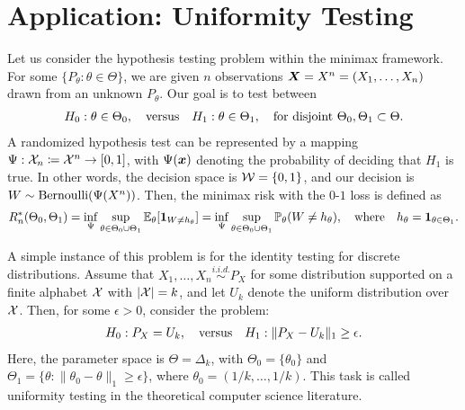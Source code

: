 \documentclass[12pt]{article}
\begin{document}
\section{Application: Uniformity Testing} 
\label{sec:application-1-uniformity-testing}

Let us consider the hypothesis testing problem within the minimax framework. For some $\{P_\theta: \theta \in \Theta\}$, we are given $n$ \iid observations ${\boldsymbol X} = X^n = (X_1, \ldots, X_n)$ drawn from an unknown $P_\theta$. Our goal is to test between 
\begin{align}
	H_0: \theta \in \Theta_0, \quad \text{versus} \quad H_1: \theta \in \Theta_1, \quad \text{for disjoint } \Theta_0, \Theta_1 \subset \Theta. 
\end{align}
A randomized hypothesis test can be represented by a mapping $\Psi:{\cal X}_n \coloneqq {\cal X}^n \to [0,1]$, with $\Psi({\boldsymbol x})$ denoting the probability of deciding that $H_1$ is true. In other words, the decision space is ${\cal W} = \{0,1\}$, and our decision is $W \sim \mathrm{Bernoulli}(\Psi(X^n))$. Then, the minimax risk with the $0$-$1$ loss is defined as 
\begin{align}
R_n^*(\Theta_0, \Theta_1) = \inf_{\Psi} \sup_{\theta \in \Theta_0 \cup \Theta_1} \mathbb{E}_{\theta}[\boldsymbol{1}_{W \neq h_\theta}] = \inf_{\Psi} \sup_{\theta \in \Theta_0 \cup \Theta_1} \mathbb{P}_{\theta}(W \neq h_\theta), \quad \text{where} \quad h_\theta = \boldsymbol{1}_{\theta \in \Theta_1}. 
\end{align}

A simple instance of this problem is for the identity testing for discrete distributions. Assume that $X_1, \ldots, X_n \overset{i.i.d.}{\sim} P_X$ for some distribution supported on a finite alphabet ${\cal X}$ with $|{\cal X}|=k$, and let $U_k$ denote the uniform distribution over ${\cal X}$. Then, for some $\epsilon>0$, consider the problem: 
\begin{align}
H_0: P_X = U_k, \quad \text{versus} \quad H_1: \|P_X - U_k\|_1 \geq \epsilon. 
\end{align}
Here, the parameter space is $\Theta = \Delta_k$, with $\Theta_0 = \{\theta_0\}$ and $\Theta_1 = \{\theta: \|\theta_0- \theta\|_1 \geq \epsilon\}$, where $\theta_0 = (1/k, \ldots, 1/k)$. 
This task is called uniformity testing in the theoretical computer science literature. 
\end{document}
